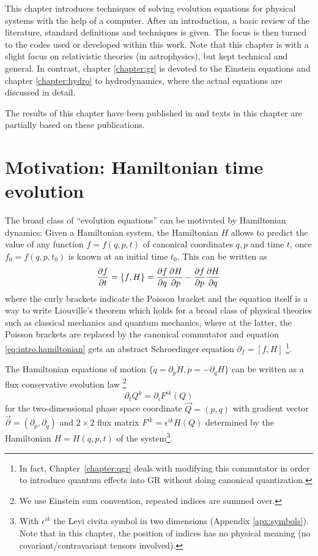 This chapter introduces techniques of solving evolution equations
for physical systems with the help of a computer.
After an introduction,
a basic review of the literature, standard definitions and techniques
is given. The focus is then turned to the codes used
or developed within this work. Note that this chapter is with a slight
focus on relativistic theories (in astrophysics), but kept technical and
general. In contrast, chapter \ref{chapter:gr} is devoted to the
Einstein equations and chapter \ref{chapter:hydro} to hydrodynamics,
where the actual equations are discussed in detail.

The results of this chapter have been published in
\cite{Dumbser2017,Fambri2018,Koeppel2017,exahype-review} and texts
in this chapter are partially based on these publications.

\section{Motivation: Hamiltonian time 
evolution}\label{sec:hamiltonian-motivation}
The broad class of ``evolution equations'' can be motivated
by Hamiltonian dynamics: Given a 
Hamiltonian system, the Hamiltonian $H$ allows to predict the value of
any function $f=f(q,p,t)$ of canonical coordinates $q,p$ and time $t$,
once $f_0=f(q,p,t_0)$ is known at an initial time $t_0$.
This can be written as
\begin{equation}\label{eq:intro.hamiltonian}
\frac{\partial f}{\partial t} = \left\{ f, H \right\}
= \frac{\partial f}{\partial q} \frac{\partial H}{\partial p} - \frac{\partial f}{\partial p} \frac{\partial H}{\partial q}
\end{equation}
where the curly brackets indicate the Poisson bracket and the equation
itself is a way to write Liouville's theorem which holds for a broad class
of physical theories such as classical mechanics and quantum mechanics,
where at the latter, the Poisson brackets are replaced by the canonical
commutator and equation \eqref{eq:intro.hamiltonian} gets an abstract
Schroedinger equation $\partial_f = [f,H]$ \footnote{
	In fact, Chapter~\vref{chapter:qgr} deals with modifying this
	commutator in order to introduce quantum effects into GR without
	doing canonical quantization.
}.

The Hamiltonian equations of motion
$\{ \dot q=\partial_p H, \dot p=-\partial_q H\}$ can be written as a
flux conservative evolution law
\footnote{We use Einstein sum convention, repeated indices are summed over.}
\begin{equation}\label{sec:intro-hamilton-flux}
\partial_t Q^k = \partial_i F^{ik}(Q)
\end{equation}
for the two-dimensional phase space coordinate $\vec Q=(p,q)$ with gradient 
vector $\vec \partial=(\partial_p, \partial_q)$ and $2\times2$ flux matrix
$F^{ik}=\epsilon^{ik} H(Q)$ determined by the Hamiltonian
$H=H(q,p,t)$ of the system\footnote{
  With $\epsilon^{ik}$ the Levi civita symbol in two dimensions
  (Appendix \vref{apx:symbols}).  
  Note that in this chapter, the position of indices has no
  physical meaning
  (no covariant/contravariant tensors involved).
}. 

